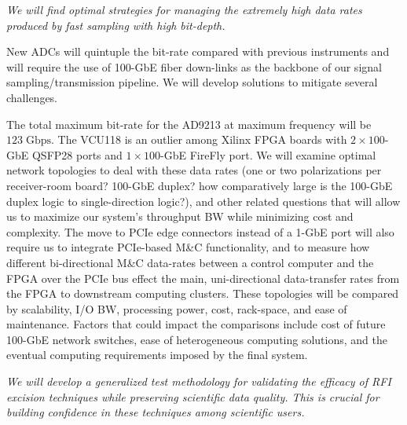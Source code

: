 \documentclass[10pt]{myNSF}
\begin{document}
\emph{We will find optimal strategies for managing the extremely high
  data rates produced by fast sampling with high bit-depth.}

New ADCs will quintuple the bit-rate compared with previous
instruments and will require the use of 100-GbE fiber down-links as
the backbone of our signal sampling/transmission pipeline.  We will
develop solutions to mitigate several challenges.

The total maximum bit-rate for the AD9213 at maximum frequency will be
$123\; \mathrm{Gbps}$.  The VCU118 is an outlier among Xilinx FPGA
boards with $2 \times100$-GbE QSFP28 ports and $1 \times 100$-GbE
FireFly port.  We will examine optimal network topologies to deal with
these data rates (one or two polarizations per receiver-room board?
100-GbE duplex? how comparatively large is the 100-GbE duplex logic to
single-direction logic?), and other related questions that will allow
us to maximize our system's throughput BW while minimizing cost and
complexity. The move to PCIe edge connectors instead of a 1-GbE port
will also require us to integrate PCIe-based M\&C functionality, and
to measure how different bi-directional M\&C data-rates between a
control computer and the FPGA over the PCIe bus effect the main,
uni-directional data-transfer rates from the FPGA to downstream
computing clusters.  These topologies will be compared by scalability,
I/O BW, processing power, cost, rack-space, and ease of
maintenance. Factors that could impact the comparisons include cost of
future 100-GbE network switches, ease of heterogeneous computing
solutions, and the eventual computing requirements imposed by the
final system.

\label{sec:rfi_procedures}

\emph{We will develop a generalized test methodology for validating
  the efficacy of RFI excision techniques while preserving scientific
  data quality.  This is crucial for building confidence in these
  techniques among scientific users.}
\end{document}
